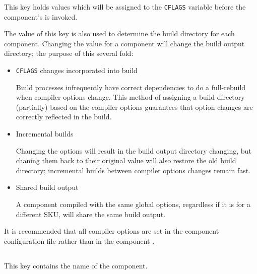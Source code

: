 This key holds values which will be assigned to the \texttt{CFLAGS}
variable before the component's \makefile is invoked.

The value of this key is also used to determine the build directory
for each component.  Changing the value for a component will change
the build output directory; the purpose of this several fold:

\begin{itemize}
\item \texttt{CFLAGS} changes incorporated into build

  Build processes infrequently have correct dependencies to do a
  full-rebuild when compiler options change.  This method of assigning
  a build directory (partially) based on the compiler options
  guarantees that option changes are correctly reflected in the build.

\item Incremental builds

  Changing the options will result in the build output directory
  changing, but chaning them back to their original value will also
  restore the old build directory; incremental builds between compiler
  options changes remain fast.

\item Shared build output

  A component compiled with the same global options, regardless if it
  is for a different SKU, will share the same build output.

\end{itemize}

It is recommended that all compiler options are set in the component
configuration file rather than in the component \makefile.


\subsection{}\label{variables:component}

This key contains the name of the component.


\subsection{}\label{variables:configuration-file}

